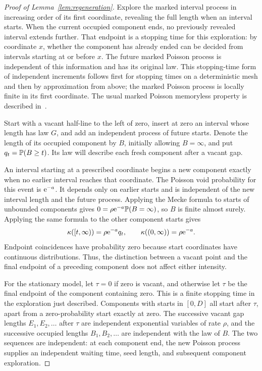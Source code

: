 \documentclass[11pt,letterpaper]{article}
\begin{document}
\begin{proof}[Proof of Lemma~\ref{lem:regeneration}]
Explore the marked interval process in increasing order of its first coordinate, revealing the full length when an interval starts. When the current occupied component ends, no previously revealed interval extends further. That endpoint is a stopping time for this exploration: by coordinate $x$, whether the component has already ended can be decided from intervals starting at or before $x$. The future marked Poisson process is independent of this information and has its original law. This stopping-time form of independent increments follows first for stopping times on a deterministic mesh and then by approximation from above; the marked Poisson process is locally finite in its first coordinate. The usual marked Poisson memoryless property is described in~\cite[Section~7.2]{LP17}.

Start with a vacant half-line to the left of zero, insert at zero an interval whose length has law $G$, and add an independent process of future starts. Denote the length of its occupied component by $B$, initially allowing $B=\infty$, and put $q_t=\P(B\ge t)$. Its law will describe each fresh component after a vacant gap.

An interval starting at a prescribed coordinate begins a new component exactly when no earlier interval reaches that coordinate. The Poisson void probability for this event is $\e^{-a}$. It depends only on earlier starts and is independent of the new interval length and the future process. Applying the Mecke formula to starts of unbounded components gives $0=\rho\e^{-a}\P(B=\infty)$, so $B$ is finite almost surely. Applying the same formula to the other component starts gives
\begin{equation}\label{eq:component-law}
 \kappa([t,\infty))=\rho\e^{-a}q_t,\qquad
 \kappa((0,\infty))=\rho\e^{-a}.
\end{equation}
Endpoint coincidences have probability zero because start coordinates have continuous distributions. Thus, the distinction between a vacant point and the final endpoint of a preceding component does not affect either intensity.

For the stationary model, let $\tau=0$ if zero is vacant, and otherwise let $\tau$ be the final endpoint of the component containing zero. This is a finite stopping time in the exploration just described. Components with starts in $[0,D]$ all start after $\tau$, apart from a zero-probability start exactly at zero. The successive vacant gap lengths $E_1,E_2,\ldots$ after $\tau$ are independent exponential variables of rate $\rho$, and the successive occupied lengths $B_1,B_2,\ldots$ are independent with the law of $B$. The two sequences are independent: at each component end, the new Poisson process supplies an independent waiting time, seed length, and subsequent component exploration.


\end{proof}
\end{document}
